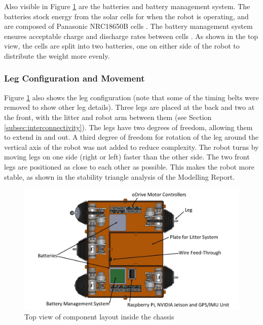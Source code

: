 Also visible in Figure \ref{fig:chassis_topview} are the batteries and battery management system. The batteries stock energy from the solar cells for when the robot is operating, and are composed of Panasonic NRC18650B cells \cite{18650batterystore_panasonic_2019}. The battery management system ensures acceptable charge and discharge rates between cells \cite{voltaplex_6s16s_nodate}. As shown in the top view, the cells are split into two batteries, one on either side of the robot to distribute the weight more evenly.


\subsubsection{Leg Configuration and Movement}

Figure \ref{fig:chassis_topview} also shows the leg configuration (note that some of the timing belts were removed to show other leg details). Three legs are placed at the back and two at the front, with the litter and robot arm between them (see Section \ref{subsec:interconnectivity}).
The legs have two degrees of freedom, allowing them to extend in and out. A third degree of freedom for rotation of the leg around the vertical axis of the robot was not added to reduce complexity. The robot turns by moving legs on one side (right or left) faster than the other side. 
The two front legs are positioned as close to each other as possible. This makes the robot more stable, as shown in the stability triangle analysis of the Modelling Report. 

\begin{figure}
    \centering
    \includegraphics[width=\textwidth]{2_ProposedDesign/img/TopViewA.jpg}
    \caption{Top view of component layout inside the chassis}
    \label{fig:chassis_topview}
\end{figure}



